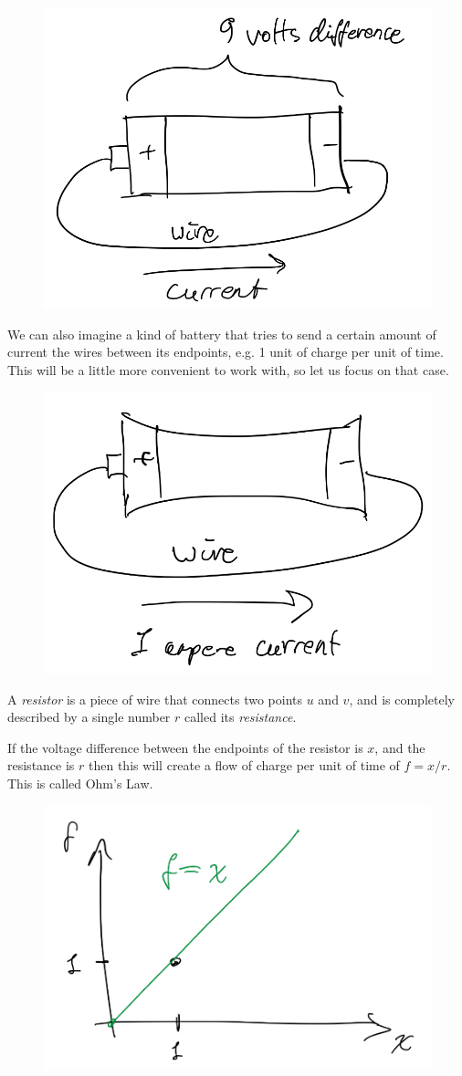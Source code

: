 \begin{figure}[H]
  \centering
  \includegraphics[width=0.5\linewidth]{fig/lecture1_battery9volts.png}
  \label{fig:battery-volt}
\end{figure}

We can also imagine a kind of battery that tries to send a certain
amount of current the wires between its endpoints, e.g. 1 unit of charge per
unit of time.
This will be a little more convenient to work with, so let us focus on
that case.

\begin{figure}[H]
  \centering
  \includegraphics[width=0.5\linewidth]{fig/lecture1_battery1ampere.png}
  \label{fig:battery-current}
\end{figure}

A \emph{resistor} is a piece of wire that connects two
points $u$ and $v$, and is completely described by a single number $r$
called its \emph{resistance}.

If the voltage difference between the endpoints of the resistor is
$x$, and the resistance is $r$ then this will create a flow of charge per unit of time of $f = x / r$.
This is called Ohm's Law.

\begin{figure}[H]
  \centering
  \includegraphics[width=0.5\linewidth]{fig/lecture1_ohmslawx-vs-f.png}
  \label{fig:ohmslaw}
\end{figure}

